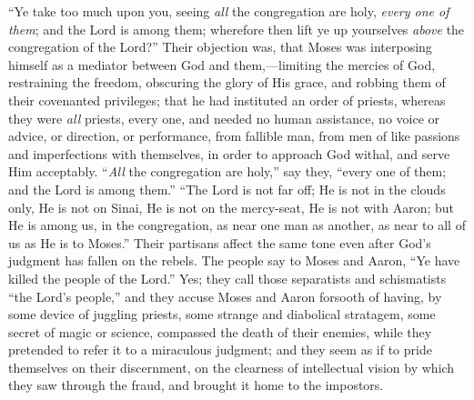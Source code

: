 ``Ye take too much upon you, seeing \emph{all} the congregation
are holy, \emph{every one of them}; and the Lord is among them;
wherefore then lift ye up yourselves \emph{above} the congregation of
the Lord?'' Their objection was, that Moses was interposing
himself as a mediator between God and them,—limiting the mercies of
God, restraining the freedom, obscuring the glory of His grace, and
robbing them of their covenanted privileges; that he had instituted an
order of priests, whereas they were \emph{all} priests, every one, and
needed no human assistance, no voice or advice, or direction, or
performance, from fallible man, from men of like passions and
imperfections with themselves, in order to approach God withal, and
serve Him acceptably. ``\emph{All} the congregation are
holy,'' say they, ``every one of them; and the Lord is among
them.'' ``The Lord is not far off; He is not in the clouds
only, He is not on Sinai, He is not on the mercy-seat, He is not with
Aaron; but He is among us, in the congregation, as near one man as
another, as near to all of us as He is to Moses.'' Their partisans
affect the same tone even after God's judgment has fallen on the
rebels. The people say to Moses and Aaron, ``Ye have killed the
people of the Lord.'' Yes; they call those separatists and
schismatists ``the Lord's people,'' and they accuse Moses and
Aaron forsooth of having, by some device of juggling priests, some
strange and diabolical stratagem, some secret of magic or science,
compassed the death of their enemies, while they pretended to refer it
to a miraculous judgment; and they seem as if to pride themselves on
their discernment, on the clearness of intellectual vision by which
they saw through the fraud, and brought it home to the impostors.


